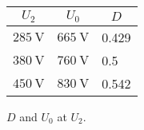 \begin{solutiontable}[htb]
    \centering  %
    \begin{tabular}{lll}
        \toprule
        \multicolumn{1}{c}{$U_\mathrm{2}$} & \multicolumn{1}{c}{$U_\mathrm{0}$} & \multicolumn{1}{c}{$D$} \\
        \midrule 
        $\SI{285}{\volt}$ & $\SI{665}{\volt}$ & 0.429\\ 
        $\SI{380}{\volt}$ & $\SI{760}{\volt}$ & 0.5 \\ 
        $\SI{450}{\volt}$ & $\SI{830}{\volt}$ & 0.542\\ 
        \bottomrule
    \end{tabular}
    \caption{$D$ and $U_\mathrm{0}$ at $U_\mathrm{2}$.}
    \label{table:DutyCycleDCLinkVoltageAtOutputVoltage}
\end{solutiontable}
